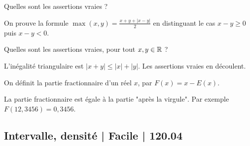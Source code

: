 \begin{question}
Quelles sont les assertions vraies ?
\begin{answers}



  
\end{answers}
\begin{explanations}
On prouve la formule $\max(x,y) = \frac{x+y + |x-y|}{2}$ en distinguant le cas $x-y \ge0$ puis $x-y<0$.
\end{explanations}
\end{question}


\begin{question}
Quelles sont les assertions vraies, pour tout $x,y\in\mathbb{R}$ ?
\begin{answers}



\end{answers}
\begin{explanations}
L'inégalité triangulaire est $|x+y| \le |x| + |y|$. Les assertions vraies en découlent.
\end{explanations}
\end{question}


\begin{question}
On définit la partie fractionnaire d'un réel $x$, par $F(x) = x -E(x)$. 
\begin{answers}



\end{answers}
\begin{explanations}
La partie fractionnaire est égale à la partie "après la virgule".
Par exemple $F(12,3456) = 0,3456$.
\end{explanations}
\end{question}


\subsection{Intervalle, densité | Facile | 120.04}


